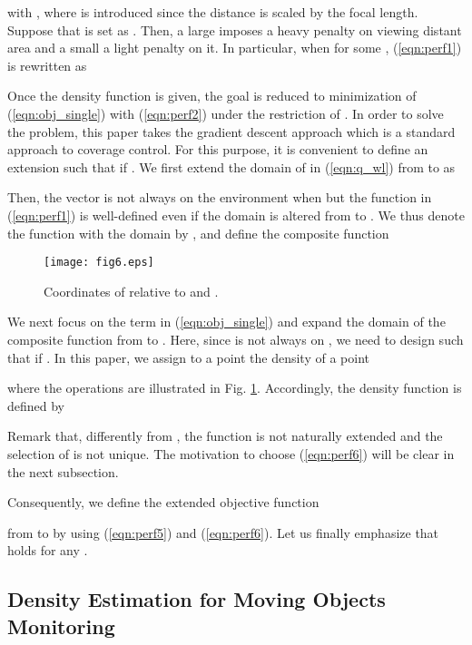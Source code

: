 \documentclass[conference,letterpaper]{ieeeconf}
\begin{document}
with , where  is introduced 
since the distance is scaled by the focal length. 
Suppose that  is set as .
Then, a large  imposes a heavy penalty on viewing distant area
and a small  a light penalty on it.
In particular, when  for some ,
(\ref{eqn:perf1}) is rewritten as



Once the density function  is given,
the goal is reduced to minimization of
(\ref{eqn:obj_single}) with (\ref{eqn:perf2})
under the restriction of .
In order to solve the problem,
this paper takes the gradient descent approach
which is a standard approach to coverage control.
For this purpose,
it is convenient to define an extension 
such that  if .
We first extend the domain
of  in (\ref{eqn:q_wl}) from 
to  as

Then, the vector  is not always 
on the environment when  but
the function  in (\ref{eqn:perf1}) is well-defined
even if the domain is altered from  to . 
We thus denote the function with the domain  by ,
and define the composite function 





\begin{figure}[t]
\begin{center}
\texttt{[image: fig6.eps]}
\caption{Coordinates of  relative to  and .}
\label{fig:proj4}
\end{center}
\end{figure}




We next focus on the term  in
(\ref{eqn:obj_single}) and expand the domain of the composite function
from  to .
Here, since  is not always on ,
we need to design  such that
 if .
In this paper, we assign to a point  
the density of a point 

where the operations are illustrated in Fig. \ref{fig:proj4}.
Accordingly, the density function is defined by

Remark that, differently from , the function 
is not naturally extended and the selection of  is not unique. 
The motivation to choose (\ref{eqn:perf6}) will be clear in the 
next subsection.



Consequently, we define the extended objective function

from  to  by using
(\ref{eqn:perf5}) and (\ref{eqn:perf6}).
Let us finally emphasize that  holds for any .



\subsection{Density Estimation for Moving Objects Monitoring}
\end{document}
